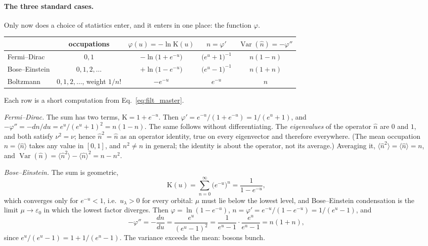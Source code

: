 \documentclass[10pt,a4paper]{article}
\theoremstyle{plain}
\theoremstyle{remark}
\newcommand{\Var}{\operatorname{Var}}
\providecommand{\Kappa}{\mathrm{K}}
\begin{document}
\paragraph{The three standard cases.} Only now does a choice of statistics enter,
and it enters in one place: the function $\varphi$.
\begin{center}
\small
\begin{tabular}{lcccc}
\toprule
& occupations & $\varphi(u)=-\ln\Kappa(u)$ & $n=\varphi'$ & $\Var(\hat n)=-\varphi''$ \\
\midrule
Fermi--Dirac & $0,1$ & $-\ln\big(1+e^{-u}\big)$ & $\big(e^{u}+1\big)^{-1}$ & $n(1-n)$ \\[2pt]
Bose--Einstein & $0,1,2,\dots$ & $+\ln\big(1-e^{-u}\big)$ & $\big(e^{u}-1\big)^{-1}$ & $n(1+n)$ \\[2pt]
Boltzmann & $0,1,2,\dots$, weight $1/n!$ & $-e^{-u}$ & $e^{-u}$ & $n$ \\
\bottomrule
\end{tabular}
\end{center}
Each row is a short computation from Eq.~\eqref{eq:filt_master}.

\emph{Fermi--Dirac.} The sum has two terms, $ \Kappa = 1 + e^{-u} $. Then
$ \varphi' = e^{-u}/(1 + e^{-u}) = 1/(e^{u} + 1) $, and
$ -\varphi'' = -dn/du = e^{u}/(e^{u} + 1)^{2} = n(1-n) $.
The same follows without
differentiating. The \emph{eigenvalues} of the operator $ \hat n $ are $ 0 $ and $ 1 $,
and both satisfy $ \nu^{2} = \nu $; hence $ \hat n^{2} = \hat n $ as an operator
identity, true on every eigenvector and therefore everywhere. (The mean occupation
$ n = \langle\hat n\rangle $ takes any value in $ [0, 1] $, and $ n^{2} \neq n $ in
general; the identity is about the operator, not its average.) Averaging it,
$ \langle\hat n^{2}\rangle = \langle\hat n\rangle = n $, and
$ \Var(\hat n) = \langle\hat n^{2}\rangle - \langle\hat n\rangle^{2} = n - n^{2} $.

\emph{Bose--Einstein.} The sum is geometric,
\[
  \Kappa(u) = \sum_{n=0}^{\infty}\big(e^{-u}\big)^{n} = \frac{1}{1 - e^{-u}} ,
\]
which converges only for $ e^{-u} < 1 $, i.e.\ $ u_\lambda > 0 $ for every orbital:
$ \mu $ must lie below the lowest level, and Bose--Einstein condensation is the
limit $ \mu \to \varepsilon_0 $ in which the lowest factor diverges. Then
$ \varphi = \ln(1 - e^{-u}) $, $ n = \varphi' = e^{-u}/(1 - e^{-u}) = 1/(e^{u} - 1) $, and
\[
  -\varphi'' = -\frac{dn}{du} = \frac{e^{u}}{(e^{u} - 1)^{2}}
  = \frac{1}{e^{u} - 1}\cdot\frac{e^{u}}{e^{u} - 1} = n(1 + n),
\]
since $ e^{u}/(e^{u} - 1) = 1 + 1/(e^{u} - 1) $. The variance exceeds the mean:
bosons bunch.
\end{document}
